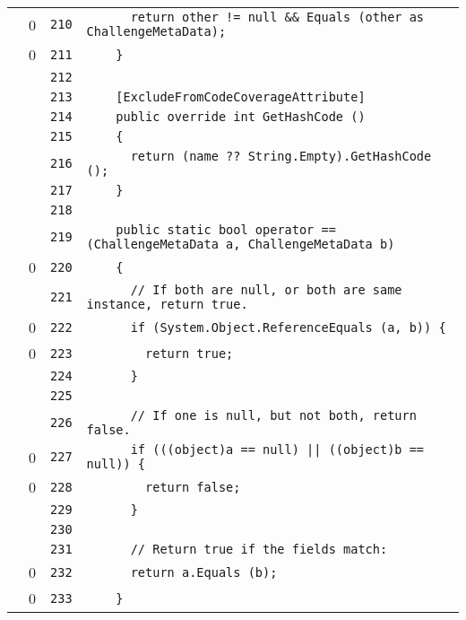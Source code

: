 \documentclass[a4paper,10pt]{article}
\begin{document}
\begin{longtable}[l]{lrrl}
\cellcolor{red} & 0 & \verb~210~ & \verb~      return other != null && Equals (other as ChallengeMetaData);~\\
\cellcolor{red} & 0 & \verb~211~ & \verb~    }~\\
\cellcolor{gray} &  & \verb~212~ & \verb~~\\
\cellcolor{gray} &  & \verb~213~ & \verb~    [ExcludeFromCodeCoverageAttribute]~\\
\cellcolor{gray} &  & \verb~214~ & \verb~    public override int GetHashCode ()~\\
\cellcolor{gray} &  & \verb~215~ & \verb~    {~\\
\cellcolor{gray} &  & \verb~216~ & \verb~      return (name ?? String.Empty).GetHashCode ();~\\
\cellcolor{gray} &  & \verb~217~ & \verb~    }~\\
\cellcolor{gray} &  & \verb~218~ & \verb~~\\
\cellcolor{gray} &  & \verb~219~ & \verb~    public static bool operator == (ChallengeMetaData a, ChallengeMetaData b)~\\
\cellcolor{red} & 0 & \verb~220~ & \verb~    {~\\
\cellcolor{gray} &  & \verb~221~ & \verb~      // If both are null, or both are same instance, return true.~\\
\cellcolor{red} & 0 & \verb~222~ & \verb~      if (System.Object.ReferenceEquals (a, b)) {~\\
\cellcolor{red} & 0 & \verb~223~ & \verb~        return true;~\\
\cellcolor{gray} &  & \verb~224~ & \verb~      }~\\
\cellcolor{gray} &  & \verb~225~ & \verb~~\\
\cellcolor{gray} &  & \verb~226~ & \verb~      // If one is null, but not both, return false.~\\
\cellcolor{red} & 0 & \verb~227~ & \verb~      if (((object)a == null) || ((object)b == null)) {~\\
\cellcolor{red} & 0 & \verb~228~ & \verb~        return false;~\\
\cellcolor{gray} &  & \verb~229~ & \verb~      }~\\
\cellcolor{gray} &  & \verb~230~ & \verb~~\\
\cellcolor{gray} &  & \verb~231~ & \verb~      // Return true if the fields match:~\\
\cellcolor{red} & 0 & \verb~232~ & \verb~      return a.Equals (b);~\\
\cellcolor{red} & 0 & \verb~233~ & \verb~    }~\\

\end{longtable}
\end{document}
